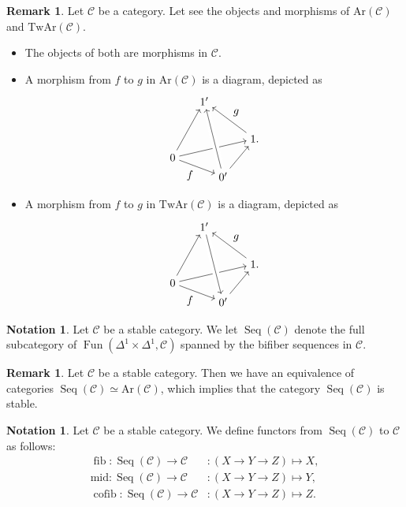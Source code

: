 \documentclass[a4paper,dvipdfmx,11pt,reqno]{amsart}
\DeclareMathOperator{\fib}{fib}
\DeclareMathOperator{\cofib}{cofib}
\renewcommand{\mid}{\mathrm{mid}}
\DeclareMathOperator{\Fun}{Fun}
\newcommand{\C}{\mathcal{C}}
\DeclareMathOperator{\Seq}{Seq}
\newcommand{\Ar}{\mathrm{Ar}}
\newcommand{\TwAr}{\mathrm{TwAr}}
\theoremstyle{definition}
\newtheorem{notation}[theorem]{Notation}
\newtheorem{remark}[theorem]{Remark}
\begin{document}
\begin{remark} \label{Ber.rem.3.2}
  Let $\C$ be a category.
  Let see the objects and morphisms of $\Ar(\C)$ and $\TwAr(\C)$.
  \begin{itemize}
    \item The objects of both are morphisms in $\C$.
    \item A morphism from $f$ to $g$ in $\Ar(\C)$ is a diagram, depicted as 
    \[\begin{tikzpicture}[auto]
      \node (0) at (0,0) {$0$};
      \node (1) at (1.6,-0.6) {$0'$};
      \node (2) at (2.6,0.6) {$1.$};
      \node (3) at (1,1.8) {$1'$};
      \draw[->] (0) -- node[swap] {$f$} (1);
      \draw[->] (0) -- node {} (2);
      \draw[->] (0) -- node {} (3);
      \draw[->] (1) -- node {} (2);
      \draw[-, line width=6pt,draw=white] (1) -- node {} (3);
      \draw[->] (1) -- node {} (3);
      \draw[->] (2) -- node[swap] {$g$} (3);
    \end{tikzpicture}\]
    \item A morphism from $f$ to $g$ in $\TwAr(\C)$ is a diagram, depicted as 
    \[\begin{tikzpicture}[auto]
      \node (0) at (0,0) {$0$};
      \node (1) at (1.6,-0.6) {$0'$};
      \node (2) at (2.6,0.6) {$1.$};
      \node (3) at (1,1.8) {$1'$};
      \draw[->] (0) -- node[swap] {$f$} (1);
      \draw[->] (0) -- node {} (2);
      \draw[->] (0) -- node {} (3);
      \draw[->] (1) -- node {} (2);
      \draw[-, line width=6pt,draw=white] (1) -- node {} (3);
      \draw[->] (3) -- node {} (1);
      \draw[->] (2) -- node[swap] {$g$} (3);
    \end{tikzpicture}\]
  \end{itemize}
\end{remark}

\begin{notation} \label{Ber.p49}
  Let $\C$ be a stable category.
  We let $\Seq(\C)$ denote the full subcategory of $\Fun(\Delta^1 \times \Delta^1,\C)$ spanned by the bifiber sequences in $\C$.
\end{notation}

\begin{remark}
  Let $\C$ be a stable category.
  Then we have an equivalence of categories $\Seq(\C) \simeq \Ar(\C)$, which implies that the category $\Seq(\C)$ is stable.
\end{remark}

\begin{notation}
  Let $\C$ be a stable category.
  We define functors from $\Seq(\C)$ to $\C$ as follows:
  \begin{align*}
    \fib   : \Seq(\C) \to \C &: (X \to Y \to Z) \mapsto X, \\
    \mid   : \Seq(\C) \to \C &: (X \to Y \to Z) \mapsto Y, \\
    \cofib : \Seq(\C) \to \C &: (X \to Y \to Z) \mapsto Z.
  \end{align*}
\end{notation}
\end{document}
